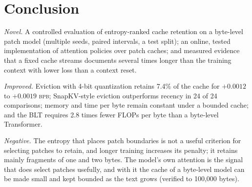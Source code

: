\documentclass[10pt,twocolumn]{extarticle}
\newcommand{\bpb}{\textsc{bpb}}
\begin{document}
\section{Conclusion}
\textit{Novel.} A controlled evaluation of entropy-ranked cache retention on a byte-level patch model (multiple seeds, paired intervals, a test split); an online, tested implementation of attention policies over patch caches; and measured evidence that a fixed cache streams documents several times longer than the training context with lower loss than a context reset.

\textit{Improved.} Eviction with 4-bit quantization retains 7.4\% of the cache for $+0.0012$ to $+0.0019$ \bpb; SnapKV-style eviction outperforms recency in 24 of 24 comparisons; memory and time per byte remain constant under a bounded cache; and the BLT requires 2.8 times fewer FLOPs per byte than a byte-level Transformer.

\textit{Negative.} The entropy that places patch boundaries is not a useful criterion for selecting patches to retain, and longer training increases its penalty; it retains mainly fragments of one and two bytes. The model's own attention is the signal that does select patches usefully, and with it the cache of a byte-level model can be made small and kept bounded as the text grows (verified to 100,000 bytes).


\clearpage
\balance


\end{document}
